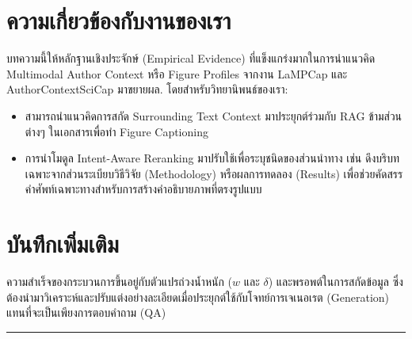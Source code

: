 \documentclass[10pt,a4paper]{article}
\begin{document}
\section*{ความเกี่ยวข้องกับงานของเรา}

บทความนี้ให้หลักฐานเชิงประจักษ์ (Empirical Evidence) ที่แข็งแกร่งมากในการนำแนวคิด Multimodal Author Context หรือ Figure Profiles จากงาน LaMPCap และ AuthorContextSciCap มาขยายผล. โดยสำหรับวิทยานิพนธ์ของเรา:
\begin{itemize}
  \item สามารถนำแนวคิดการสกัด Surrounding Text Context มาประยุกต์ร่วมกับ RAG ข้ามส่วนต่างๆ ในเอกสารเพื่อทำ Figure Captioning
  \item การนำโมดูล Intent-Aware Reranking มาปรับใช้เพื่อระบุชนิดของส่วนนำทาง เช่น ดึงบริบทเฉพาะจากส่วนระเบียบวิธีวิจัย (Methodology) หรือผลการทดลอง (Results) เพื่อช่วยคัดสรรคำศัพท์เฉพาะทางสำหรับการสร้างคำอธิบายภาพที่ตรงรูปแบบ
\end{itemize}

\section*{บันทึกเพิ่มเติม}
ความสำเร็จของกระบวนการขึ้นอยู่กับตัวแปรถ่วงน้ำหนัก ($w$ และ $\delta$) และพรอพต์ในการสกัดข้อมูล ซึ่งต้องนำมาวิเคราะห์และปรับแต่งอย่างละเอียดเมื่อประยุกต์ใช้กับโจทย์การเจเนอเรต (Generation) แทนที่จะเป็นเพียงการตอบคำถาม (QA)

\vspace{16pt}
\noindent\rule{\textwidth}{1pt}
\end{document}
